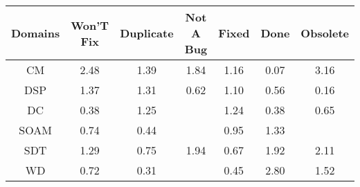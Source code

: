 \begin{tabular}{|c||c|c|c|c|c|c|}
\hline
Domains & Won'T Fix & Duplicate & Not A Bug & Fixed & Done & Obsolete \\ 
\hline
CM & \cellcolor[rgb]{0.6490791539533374,0.7164059150305282,0.42} 2.48 & \cellcolor[rgb]{0.8406028616676733,0.8071276713162663,0.42} 1.39 & \cellcolor[rgb]{0.7621999708119153,0.7699894598582756,0.42} 1.84 & \cellcolor[rgb]{0.8812134217101815,0.8263642523890332,0.41999999999999993} 1.16 & \cellcolor[rgb]{0.76,0.13,0.28} 0.07 & \cellcolor[rgb]{0.53,0.66,0.42} 3.16 \\ 
\hline
DSP & \cellcolor[rgb]{0.8445005127767461,0.8089739271047744,0.42} 1.37 & \cellcolor[rgb]{0.8557349723294743,0.8142955132086982,0.41999999999999993} 1.31 & \cellcolor[rgb]{0.8491168634567436,0.5518198203619195,0.363175739226294} 0.62 & \cellcolor[rgb]{0.8915196171100475,0.8312461344205487,0.42} 1.10 & \cellcolor[rgb]{0.8392451508822358,0.5050937141759161,0.3539621408234201} 0.56 & \cellcolor[rgb]{0.7739964625072693,0.19624992253440776,0.29306336500678465} 0.16 \\ 
\hline
DC & \cellcolor[rgb]{0.8095427822357582,0.36450250258258865,0.32623993008670765} 0.38 & \cellcolor[rgb]{0.865160089837506,0.8187600425546081,0.42} 1.25 &  & \cellcolor[rgb]{0.8670277715834288,0.8196447339079399,0.42} 1.24 & \cellcolor[rgb]{0.8095140162014285,0.36436634335342766,0.3262130817879998} 0.38 & \cellcolor[rgb]{0.8543250613244858,0.5764719569358994,0.3680367239028534} 0.65 \\ 
\hline
SOAM & \cellcolor[rgb]{0.8682272489756824,0.6422756451515631,0.38101209904397015} 0.74 & \cellcolor[rgb]{0.8196900233057818,0.41253277698070046,0.33571068841872964} 0.44 &  & \cellcolor[rgb]{0.9024067740936202,0.8040587307098022,0.4129129891540455} 0.95 & \cellcolor[rgb]{0.8514687359997168,0.8122746644209184,0.42} 1.33 &  \\ 
\hline
SDT & \cellcolor[rgb]{0.858216435829933,0.815470943287863,0.42} 1.29 & \cellcolor[rgb]{0.8704484439585807,0.6527893014039486,0.383085214361342} 0.75 & \cellcolor[rgb]{0.7448834071719007,0.7617868770814267,0.42} 1.94 & \cellcolor[rgb]{0.8568453485862182,0.5884013166414327,0.37038899201380365} 0.67 & \cellcolor[rgb]{0.7482486679066678,0.76338094795579,0.42} 1.92 & \cellcolor[rgb]{0.7139467398497721,0.7471326662446288,0.42} 2.11 \\ 
\hline
WD & \cellcolor[rgb]{0.8644286252476597,0.6242954928389222,0.37746671689781564} 0.72 & \cellcolor[rgb]{0.798711836386145,0.3132360255610857,0.3161310472937352} 0.31 &  & \cellcolor[rgb]{0.8217802128335379,0.4224263407454126,0.33766153197796867} 0.45 & \cellcolor[rgb]{0.5936322648977955,0.6901415991621136,0.41999999999999993} 2.80 & \cellcolor[rgb]{0.8179274090792442,0.7963866674585893,0.42} 1.52 \\ 
\hline
\end{tabular}